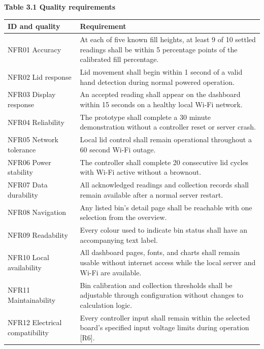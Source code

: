 \documentclass[11pt,a4paper]{article}
\begin{document}
\textbf{Table 3.1 Quality requirements}\par
{\small
\begin{longtable}{@{}>{\raggedright\arraybackslash}p{3.620cm}>{\raggedright\arraybackslash}p{11.960cm}@{}}
\toprule
\textbf{ID and quality} & \textbf{Requirement} \\ \midrule
\endhead
NFR01 Accuracy & At each of five known fill heights, at least 9 of 10 settled readings shall be within 5 percentage points of the calibrated fill percentage. \\[5pt]
NFR02 Lid response & Lid movement shall begin within 1 second of a valid hand detection during normal powered operation. \\[5pt]
NFR03 Display response & An accepted reading shall appear on the dashboard within 15 seconds on a healthy local Wi-Fi network. \\[5pt]
NFR04 Reliability & The prototype shall complete a 30 minute demonstration without a controller reset or server crash. \\[5pt]
NFR05 Network tolerance & Local lid control shall remain operational throughout a 60 second Wi-Fi outage. \\[5pt]
NFR06 Power stability & The controller shall complete 20 consecutive lid cycles with Wi-Fi active without a brownout. \\[5pt]
NFR07 Data durability & All acknowledged readings and collection records shall remain available after a normal server restart. \\[5pt]
NFR08 Navigation & Any listed bin's detail page shall be reachable with one selection from the overview. \\[5pt]
NFR09 Readability & Every colour used to indicate bin status shall have an accompanying text label. \\[5pt]
NFR10 Local availability & All dashboard pages, fonts, and charts shall remain usable without internet access while the local server and Wi-Fi are available. \\[5pt]
NFR11 Maintainability & Bin calibration and collection thresholds shall be adjustable through configuration without changes to calculation logic. \\[5pt]
NFR12 Electrical compatibility & Every controller input shall remain within the selected board's specified input voltage limits during operation [R6]. \\[5pt]
\bottomrule
\end{longtable}
}

\clearpage
\end{document}

